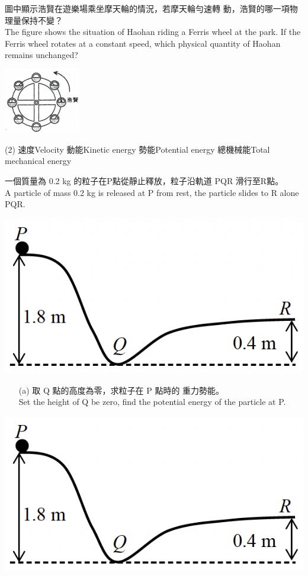 \documentclass[beamer=true]{standalone}
\begin{document}
\begin{eg}
    圖中顯示浩賢在遊樂場乘坐摩天輪的情況，若摩天輪勻速轉 動，浩賢的哪一項物理量保持不變？\\The figure shows the situation of Haohan riding a Ferris wheel at the park. If the Ferris wheel rotates at a constant speed, which physical quantity of Haohan remains unchanged?
    {\par\centering
    \includegraphics[width=0.25\textwidth]{assets/54a93bf1.png}
    \par}
    \begin{tasks}(2)
        \task 速度Velocity
        \task 動能Kinetic energy
        \task 勢能Potential energy
        \task 總機械能Total mechanical energy
    \end{tasks}
\end{eg}

\begin{eg}
    一個質量為 0.2 kg 的粒子在P點從靜止釋放，粒子沿軌道 PQR 滑行至R點。 \\A particle of mass 0.2 kg is released at P from rest, the particle slides to R alone PQR.
        {\par\centering
            \includegraphics[width=.4\textwidth]{assets/047b1413.png}
            \par}

\end{eg}

\begin{eg}
    \begin{itemize}
        \item [(a)]取 Q 點的高度為零，求粒子在 P 點時的 重力勢能。 \\Set the height of Q be zero, find the potential energy of the particle at P.
    \end{itemize}{\par\raggedleft
    \includegraphics[width=.4\textwidth]{assets/047b1413.png}
    \par}
\end{eg}
\end{document}
